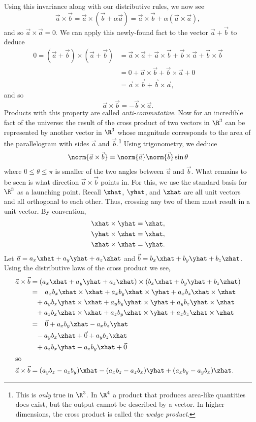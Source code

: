 Using this invariance along with our distributive rules,
we now see
\[
	\vec a\times \vec b = \vec a\times (\vec b+\alpha\vec a)=
	\vec a\times \vec b+\alpha(\vec a\times\vec a),
\]
and so $\vec a\times \vec a=0$.  We can apply this newly-found fact to
the vector $\vec a+\vec b$ to deduce
\begin{align*}
	0=(\vec a+\vec b)\times (\vec a+\vec b)&=
	\vec a\times \vec a+\vec a\times\vec b+\vec b\times \vec a+\vec b\times \vec b\\
	&=0+\vec a\times \vec b+\vec b\times \vec a+0\\
	&=\vec a\times \vec b+\vec b\times \vec a,
\end{align*}
and so
\[
	\vec a\times \vec b=-\vec b\times \vec a.
\]
Products with this property are called \emph{anti-commutative}.  Now
for an incredible fact of the universe: the result of the cross product of
two vectors in $\R^3$ can be represented by another vector in $\R^3$ whose magnitude
corresponds to the area of the parallelogram
with sides $\vec a$ and $\vec b$.\footnote{ This is \emph{only} true in $\R^3$.  In $\R^4$ a product that
produces area-like quantities does exist, but the output cannot be described by
a vector.  In higher dimensions, the cross product is called the \emph{wedge product}.}
Using trigonometry, we deduce
\[
	\norm{\vec a\times \vec b}=\norm{\vec a}\norm{\vec b}\sin \theta
\]
where $0\leq \theta\leq \pi$ is smaller of the two angles between $\vec a$ and $\vec b$.
What remains to be seen is what direction $\vec a\times \vec b$ points in.  For this,
we use the standard basis for $\R^3$ as a launching point. Recall
$\xhat$, $\yhat$, and $\zhat$ are all unit vectors and all orthogonal to each other.
Thus, crossing any two of them must result in a unit vector.  By convention,
\begin{align*}
	\xhat\times\yhat &=  \zhat, \\
	\yhat\times\zhat &=  \xhat,\\
	\zhat\times\xhat &=  \yhat.
\end{align*}
Let $\vec a=a_x\xhat +a_y\yhat +a_z\zhat$ and $\vec b=b_x\xhat +b_y\yhat +b_z\zhat$.
Using the distributive laws of the cross product we see,
\begin{align*}
	\vec a\times\vec b &= (a_x \xhat + a_y\yhat + a_z\zhat) \times (b_x\xhat + b_y\yhat + b_z\zhat) \\
	&= \phantom{+}a_xb_x\xhat\times\xhat + a_xb_y\xhat\times\yhat + a_xb_z\xhat\times\zhat \\
       &\phantom{=}+ a_yb_x\yhat\times\xhat + a_yb_y\yhat\times\yhat + a_yb_z\yhat\times\zhat \\
       &\phantom{=}+ a_zb_x\zhat\times\xhat + a_zb_y\zhat\times\yhat + a_zb_z\zhat\times\zhat \\
	&= \phantom{+}\vec 0  + a_xb_y\zhat - a_xb_z\yhat \\
       &\phantom{=}- a_yb_x\zhat + \vec 0 + a_yb_z \xhat \\
	&\phantom{=}+ a_zb_x\yhat - a_zb_y\xhat + {\vec 0}\\
\intertext{so}
\vec a\times \vec b &= (a_yb_z - a_zb_y)\xhat - (a_xb_z - a_zb_x)\yhat + (a_xb_y - a_yb_x)\zhat.
\end{align*}

